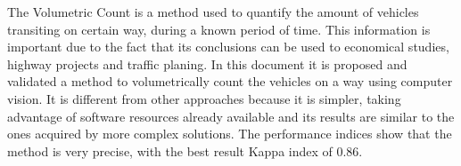 
The Volumetric Count is a method used to quantify the amount of vehicles transiting on certain way, during a known period of time. This information is important due to the fact that its conclusions can be used to economical studies, highway projects and traffic planing. In this document it is proposed and validated a method to volumetrically count the vehicles on a way using computer vision. It is different from other approaches because it is simpler, taking advantage of software resources already available and its results are similar to the ones acquired by more complex solutions. The performance indices show that the method is very precise, with the best result Kappa index of 0.86.

